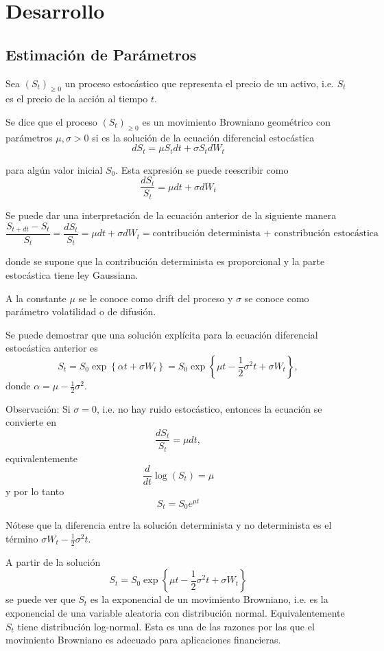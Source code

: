 \documentclass[12pt,reqno,letter]{article}
\begin{document}
	\section{Desarrollo}
	
	\subsection{Estimación de Parámetros}
	Sea $(S_t)_{\geq 0}$ un proceso estocástico que representa el precio de un activo, i.e. $S_t$ es el precio de la acción al tiempo $t$.
	
	Se dice que el proceso $(S_t)_{\geq 0}$ es un movimiento Browniano geométrico con parámetros $\mu,\sigma>0$ si es la solución de la ecuación diferencial estocástica
	$$dS_t = \mu S_t dt + \sigma S_t dW_t$$
	
	para algún valor inicial $S_0$.
	Esta expresión se puede reescribir como
	$$\frac{dS_t}{S_t} = \mu dt + \sigma dW_t$$
	
	Se puede dar una interpretación de la ecuación anterior de la siguiente manera
	$$\frac{S_{t+dt}-S_t}{S_t}=\frac{dS_t}{S_t} = \mu dt + \sigma dW_t = \mbox{contribución determinista + constribución estocástica}$$
	
	donde se supone que la contribución determinista es proporcional y la parte estocástica tiene ley Gaussiana.
	
	A la constante $\mu$ se le conoce como drift del proceso y $\sigma$ se conoce  como parámetro volatilidad o de difusión.
	
	Se puede demostrar que una solución explícita para la ecuación diferencial estocástica anterior es
	$$S_t =  S_0 \exp\left\{\alpha t + \sigma W_t\right\} =  S_0 \exp\left\{\mu t -\frac{1}{2}\sigma^2t + \sigma W_t\right\},$$
	donde $\alpha = \mu-\frac{1}{2}\sigma^2$.
	
	Observación:
	Si $\sigma = 0$, i.e. no hay ruido estocástico, entonces la ecuación se convierte en
	$$\frac{dS_t}{S_t} = \mu dt,$$
	equivalentemente
	$$\frac{d}{dt}\log(S_t) = \mu$$
	y por lo tanto
	$$S_t = S_0 e^{\mu t}$$
	
	Nótese que la diferencia entre la solución determinista y no determinista es el término $\sigma W_t-\frac{1}{2}\sigma^2t$.
	
	A partir de la solución $$S_t = S_0 \exp\left\{\mu t -\frac{1}{2}\sigma^2t + \sigma W_t\right\}$$
	se puede ver que $S_t$ es la exponencial de un movimiento Browniano, i.e. es la exponencial de una variable aleatoria con distribución normal. Equivalentemente $S_t$ tiene distribución log-normal. Esta es una de las razones por las que el movimiento Browniano es adecuado para aplicaciones financieras.
	
\end{document}
